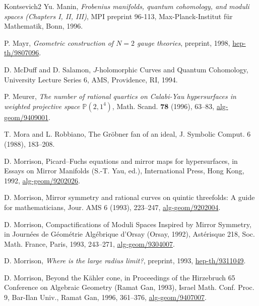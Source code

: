 \begin{thebibliography}{Kontsevich2}
\hypertarget{bib:Manin3}{} Yu. Manin, \emph{Frobenius manifolds, quantum cohomology, and moduli spaces (Chapters I, II, III)}, MPI preprint 96-113, Max-Planck-Institut für Mathematik, Bonn, 1996.

\hypertarget{bib:Mayr}{} P. Mayr, \emph{Geometric construction of $N=2$ gauge theories}, preprint, 1998, \href{https://arxiv.org/abs/hep-th/9807096}{hep-th/9807096}.

\hypertarget{bib:MS}{}
D. McDuff and D. Salamon, $J$-holomorphic Curves and Quantum Cohomology, University Lecture Series 6, AMS, Providence, RI, 1994.

\hypertarget{bib:Meurer}{} P. Meurer, \emph{The number of rational quartics on Calabi-Yau hypersurfaces in weighted projective space $\mathbb P(2,1^4)$}, Math. Scand. \textbf{78} (1996), 63--83, \href{https://arxiv.org/abs/alg-geom/9409001}{alg-geom/9409001}.

\hypertarget{bib:MR}{}
T. Mora and L. Robbiano, The Gröbner fan of an ideal, J. Symbolic Comput. 6 (1988), 183--208.

\hypertarget{bib:Morrison1}{}
D. Morrison, Picard--Fuchs equations and mirror maps for hypersurfaces,
in Essays on Mirror Manifolds (S.-T. Yau, ed.),
International Press, Hong Kong, 1992, \href{https://arxiv.org/abs/alg-geom/9202026}{alg-geom/9202026}.

\hypertarget{bib:Morrison2}{}
D. Morrison, Mirror symmetry and rational curves on quintic threefolds:
A guide for mathematicians, Jour. AMS 6 (1993), 223--247,
\href{https://arxiv.org/abs/alg-geom/9202004}{alg-geom/9202004}.

\hypertarget{bib:Morrison3}{}
D. Morrison, Compactifications of Moduli Spaces Inspired by Mirror Symmetry,
in Journées de Géométrie Algébrique d'Orsay (Orsay, 1992), Astérisque 218,
Soc. Math. France, Paris, 1993, 243--271, \href{https://arxiv.org/abs/alg-geom/9304007}{alg-geom/9304007}.

\hypertarget{bib:Morrison4}{} D. Morrison, \emph{Where is the large radius limit?}, preprint, 1993, \href{https://arxiv.org/abs/hep-th/9311049}{hep-th/9311049}.

\hypertarget{bib:Morrison5}{}
D. Morrison, Beyond the Kähler cone, in Proceedings of the Hirzebruch 65 Conference on Algebraic Geometry (Ramat Gan, 1993), Israel Math. Conf. Proc. 9, Bar-Ilan Univ., Ramat Gan, 1996, 361--376, \href{https://arxiv.org/abs/alg-geom/9407007}{alg-geom/9407007}.


\end{thebibliography}
